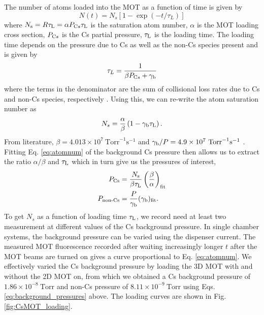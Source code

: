 The number of atoms loaded into the MOT as a function of time is given by
\begin{equation}\label{eq:atomnum}
N(t)=N_s\left[1-\exp \left(-t / \tau_L\right)\right]
\end{equation}
where $N_{\text s}=R \tau_{\text L}=\alpha P_{\text Cs} \tau_{\text L}$ is the saturation atom number, $\alpha$ is the MOT loading cross section, $P_{\text Cs}$ is the Cs partial pressure, $\tau_{\text L}$ is the loading time. The loading time depends on the pressure due to Cs as well as the non-Cs species present and is given by
\begin{equation}
\tau_L=\frac{1}{\beta P_{\text Cs}+\gamma_{\text b}}
\end{equation}
where the terms in the denominator are the sum of collisional loss rates due to Cs and non-Cs species, respectively \cite{RRCAT2020}. Using this, we can re-write the atom saturation number as 
\begin{equation}
N_s=\frac{\alpha}{\beta}\left(1-\gamma_{\text b} \tau_{\text L}\right).
\end{equation}
From literature, $\beta=4.013\times10^7 ~\text{Torr}^{-1} \text{s}^{-1}$ and $\gamma_{\text b}/P=4.9\times10^7 ~\text{Torr}^{-1} \text{s}^{-1}$ \cite{Arnthorp2012}. Fitting Eq. \ref{eq:atomnum} of the background Cs pressure then allows us to extract the ratio $\alpha/\beta$ and $\tau_{\text L}$ which in turn give us the pressures of interest, 
\begin{equation}\label{eq:background_pressures}
\begin{aligned}
    P_{\text {Cs}} &= \frac{N_{\text s}}{\beta \tau_{\text L}}\left(\frac{\beta}{\alpha}\right)_{\text {fit}}\\
    P_{\text {non-Cs}} &= \frac{P}{\gamma_{\text b}}(\gamma_{\text b})_{\text{fit}}.
\end{aligned}
\end{equation}
To get $N_s$ as a function of loading time $\tau_{\text L}$, we record need at least two measurement at different values of the Cs background pressure. In single chamber systems, the background pressure can be varied using the dispenser current. The measured MOT fluorescence recorded after waiting increasingly longer $t$ after the MOT beams are turned on gives a curve proportional to Eq. \ref{eq:atomnum}. We effectively varied the Cs background pressure by loading the 3D MOT with and without the 2D MOT on, from which we obtained a Cs background pressure of $1.86\times10^{-8} ~\text{Torr}$ and non-Cs pressure of $8.11\times10^{-9} ~\text{Torr}$ using Eqs.  \ref{eq:background_pressures} above. The loading curves are shown in Fig. \ref{fig:CsMOT_loading}.

